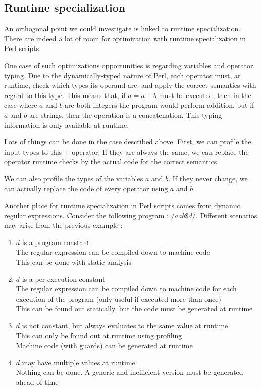 \documentclass[11pt,a4paper]{article}
\begin{document}
\subsection{Runtime specialization}

An orthogonal point we could investigate is linked to runtime specialization. There are indeed a lot of room for optimization with runtime specialization in Perl scripts.

One case of such optimizations opportunities is regarding variables and operator typing. Due to the dynamically-typed nature of Perl, each operator must, at runtime, check which types its operand are, and apply the correct semantics with regard to this type. This means that, if $a = a + b$ must be executed, then in the case where $a$ and $b$ are both integers the program would perform addition, but if $a$ and $b$ are strings, then the operation is a concatenation. This typing information is only available at runtime.

Lots of things can be done in the case described above. First, we can profile the input types to this $+$ operator. If they are always the same, we can replace the operator runtime checks by the actual code for the correct semantics.

We can also profile the types of the variables $a$ and $b$. If they never change, we can actually replace the code of every operator using $a$ and $b$.

Another place for runtime specialization in Perl scripts comes from dynamic regular expressions. Consider the following program : $/aab\$d/$. Different scenarios may arise from the previous example :
\begin{enumerate}
\item $d$ is a program constant \\
The regular expression can be compiled down to machine code\\
This can be done with static analysis
\item $d$ is a per-execution constant \\
The regular expression can be compiled down to machine code for each execution of the program (only useful if executed more than once)\\
This can be found out statically, but the code must be generated at runtime
\item $d$ is not constant, but always evaluates to the same value at runtime \\
This can only be found out at runtime using profiling \\
Machine code (with guards) can be generated at runtime
\item $d$ may have multiple values at runtime \\
Nothing can be done. A generic and inefficient version must be generated ahead of time
\end{enumerate}
\end{document}
